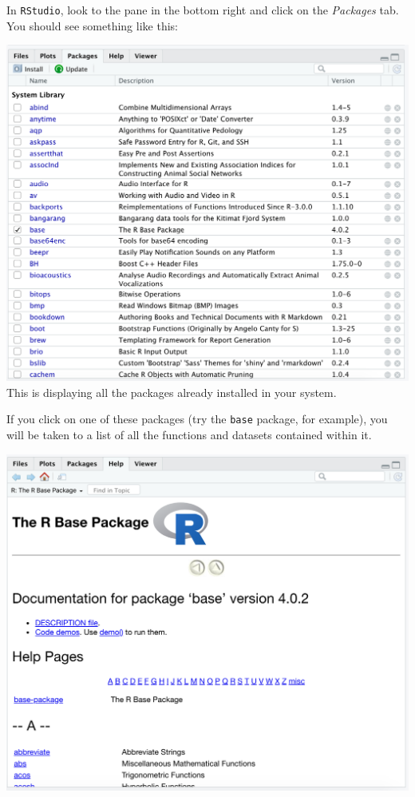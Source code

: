 \documentclass[]{book}
\begin{document}
In \texttt{RStudio}, look to the pane in the bottom right and click on the \emph{Packages} tab. You should see something like this:

\includegraphics{img/rstudio_packages.png}
This is displaying all the packages already installed in your system.

If you click on one of these packages (try the \texttt{base} package, for example), you will be taken to a list of all the functions and datasets contained within it.

\includegraphics{img/rstudio_base-package.png}
\end{document}
